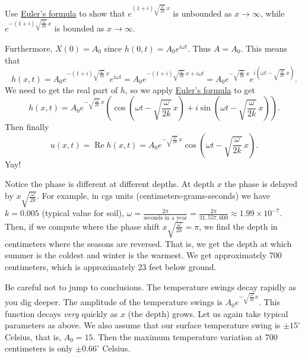 \begin{exercise}
Use \hyperref[eulersformula]{Euler's formula} to show that
$e^{(1+i)\sqrt{\frac{\omega}{2k}} \, x}$ is unbounded as $x \to \infty$,
while $e^{-(1+i)\sqrt{\frac{\omega}{2k}} \, x}$ is bounded
as $x \to \infty$.
\end{exercise}

Furthermore, $X(0) = A_0$ since $h(0,t) = A_0 e^{i \omega t}$.
Thus $A=A_0$.  This means that
\begin{equation*}
h(x,t) = A_0 e^{-(1+i)\sqrt{\frac{\omega}{2k}} \, x} e^{i \omega t}
=
A_0 e^{-(1+i)\sqrt{\frac{\omega}{2k}} \, x + i \omega t}
=
A_0 e^{-\sqrt{\frac{\omega}{2k}} \, x}
e^{i(\omega t - \sqrt{\frac{\omega}{2k}} \, x)} .
\end{equation*}
We need to get the real part of $h$, so
we apply \hyperref[eulersformula]{Euler's formula} to get
\begin{equation*}
h(x,t) =
A_0 e^{-\sqrt{\frac{\omega}{2k}} \, x}
\left(\cos \left(\omega t - \sqrt{\frac{\omega}{2k}}\, x\right) + 
i \sin \left(\omega t - \sqrt{\frac{\omega}{2k}}\, x\right) \right) .
\end{equation*}
Then finally
\begin{equation*}
u(x,t) = \operatorname{Re} h(x,t) =
A_0 e^{-\sqrt{\frac{\omega}{2k}}\, x}
\cos \left(\omega t - \sqrt{\frac{\omega}{2k}}\, x\right) .
\end{equation*}
Yay!

Notice the phase is different at different depths.  At depth $x$ the
phase is delayed by $x \sqrt{\frac{\omega}{2k}}$.
For example, in cgs units (centimeters-grams-seconds)
we have $k=0.005$ (typical value for soil),
$\omega = \frac{2\pi}{\text{seconds in a year}}
= \frac{2\pi}{31,557,600} \approx 1.99 \times {10}^{-7}$.   Then,
if we compute where the phase shift $x \sqrt{\frac{\omega}{2k}} = \pi$,
we find the depth in centimeters where the seasons are reversed.  That is,
we get the depth at which summer is the coldest and winter is the warmest.
We get
approximately 700 centimeters, which is approximately 23 feet below ground.

Be careful not to jump to conclusions.  The temperature swings decay rapidly as you dig deeper.  The
amplitude of the temperature swings is
$A_0 e^{-\sqrt{\frac{\omega}{2k}} x}$.  This function decays \emph{very}
quickly as $x$ (the depth) grows.
Let us again take
typical parameters as above.  We also assume that
our surface temperature swing is $\pm {15}^\circ$ Celsius, that is,
$A_0 = 15$.  Then the maximum temperature variation at 700 centimeters
is only $\pm {0.66}^\circ$ Celsius.

